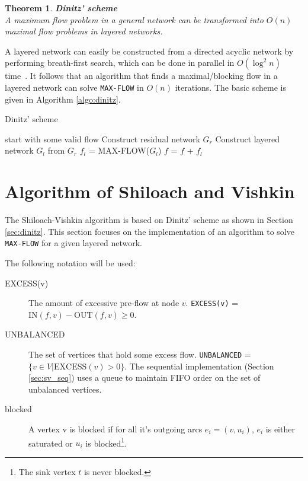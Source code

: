 \documentclass[a4paper,10pt, twocolumn]{article}
\newtheorem{theorem}[lemma]{Theorem}
\begin{document}
\begin{theorem}
\textbf{Dinitz' scheme}~\cite{dinitz70} \\
A maximum flow problem in a general network can be transformed into $O(n)$ maximal flow problems in layered networks.
\end{theorem}

A layered network can easily be constructed from a directed acyclic network by performing breath-first search, which can be done in parallel in $O(\log^{2}n)$ time~\cite{yossi81}. It follows that an algorithm that finds a maximal/blocking flow in a layered network can solve \lstinline|MAX-FLOW| in $O(n)$ iterations. The basic scheme is given in Algorithm \ref{algo:dinitz}.

\begin{algorithm}
\caption{Dinitz' scheme}
\label{algo:dinitz}
\begin{algorithmic}[1]
	\State start with some valid flow 
		\State Construct residual network $G_r$ %
		\State Construct layered network $G_l$ from $G_r$ %
		\State $f_l$ = MAX-FLOW($G_l$)  %
		\State $f$ = $f$ + $f_l$ %
	\EndWhile
	\EndFunction
\end{algorithmic}
\end{algorithm}

\section{Algorithm of Shiloach and Vishkin}
\label{sec:shiloach}
The Shiloach-Vishkin algorithm is based on Dinitz' scheme as shown in Section \ref{sec:dinitz}. This section focuses on the implementation of an algorithm to solve \lstinline|MAX-FLOW| for a given layered network.

The following notation will be used:
\begin{description}
	\item [EXCESS(v)] The amount of excessive pre-flow at node $v$. \lstinline|EXCESS(v)| = $\mathrm{IN}(f,v) - \mathrm{OUT}(f,v) \geq 0$.
	\item[UNBALANCED] The set of vertices that hold some excess flow. \lstinline|UNBALANCED| = $\{v \in V \lvert \mathrm{EXCESS}(v) > 0 \}$. The sequential implementation (Section \ref{sec:sv_seq}) uses a queue to maintain FIFO order on the set of unbalanced vertices.
	\item[blocked] A vertex v is blocked if for all it's outgoing arcs $e_i = (v, u_i)$, $e_i$ is either saturated or $u_i$ is blocked\footnote{The sink vertex $t$ is never blocked.}. 
\end{description}
	
\end{document}
